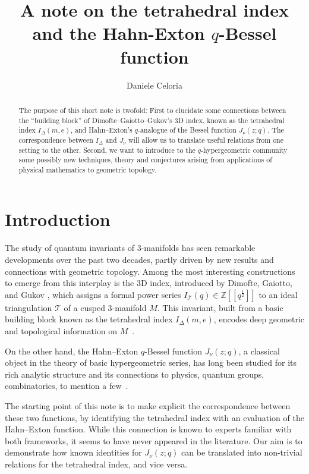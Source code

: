 \documentclass[11pt]{amsart}
\author{Daniele Celoria}
\title{A note on the tetrahedral index and the Hahn-Exton $q$-Bessel function}
\newcommand{\T}{\mathcal{T}}
\newcommand{\Z}{\mathbb{Z}}
\newcommand{\tet}{I_{\Delta}}
\begin{document}
\begin{abstract}
The purpose of this short note is twofold: First to elucidate some connections between the ``building block'' of Dimofte--Gaiotto--Gukov's $3$D index, known as the tetrahedral index $\tet\left(m,e\right)$, and Hahn--Exton's $q$-analogue of the Bessel function $J_\nu \left(z;q\right)$. The correspondence between $\tet$ and $J_\nu$ will allow us to translate useful relations from one setting to the other.
Second, we want to introduce to the $q$-hypergeometric community some possibly new techniques, theory and conjectures arising from applications of physical mathematics to geometric topology.
\end{abstract}
\maketitle


\section{Introduction}

The study of quantum invariants of $3$-manifolds has seen remarkable developments over the past two decades, partly driven by new results and connections with geometric topology. Among the most interesting constructions to emerge from this interplay is the $3$D index, introduced by Dimofte, Gaiotto, and Gukov \cite{dimofte2014gauge,dimofte20133}, which assigns a formal power series $I_\T\left(q\right) \in \Z[\![q^{\frac12}]\!]$ to an ideal triangulation $\T$ of a cusped $3$-manifold $M$. This invariant, built from a basic building block known as the tetrahedral index $\tet\left(m,e\right)$, encodes deep geometric and topological information on $M$~\cite{garoufalidis20163d,garoufalidis20163d_angle, garoufalidis2022periods, garoufalidis20243d}.

On the other hand, the Hahn–Exton $q$-Bessel function $J_\nu\left(z;q\right)$, a classical object in the theory of basic hypergeometric series, has long been studied for its rich analytic structure and its connections to physics, quantum groups, combinatorics, to mention a few~\cite{SwarttouwPhD, koelink1995q, koelink1994quantum}.

The starting point of this note is to make explicit the correspondence between these two functions, by identifying the tetrahedral index with an evaluation of the Hahn–Exton function. While this connection is  known to experts familiar with both frameworks, it seems to have never appeared in the literature. Our aim is to demonstrate how known identities for $J_\nu\left(z;q\right)$ can be translated into non-trivial relations for the tetrahedral index, and vice versa.
\end{document}
